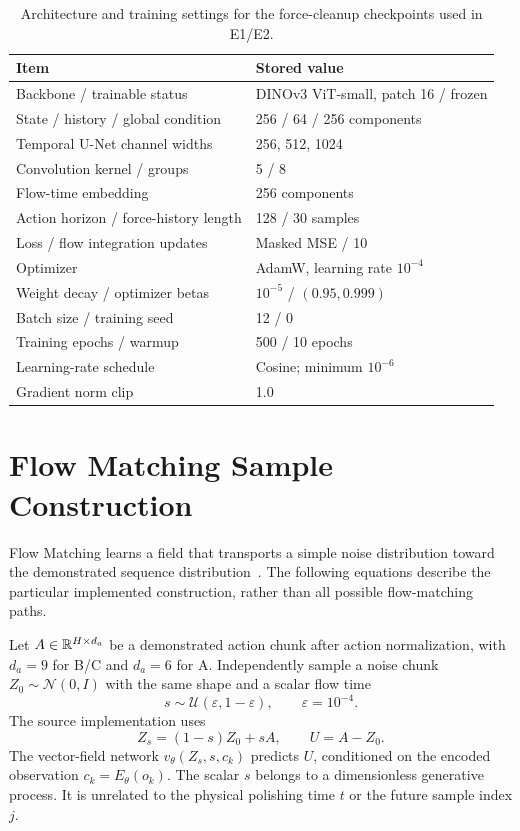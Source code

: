 \begin{table}[tbp]\centering\small
\caption[Architecture and training settings]{Architecture and training settings for the force-cleanup checkpoints used in E1/E2.}
\label{tab:learning_settings}
\begin{tabularx}{\textwidth}{P{0.48\textwidth}X}
\toprule Item & Stored value \\ \midrule
Backbone / trainable status & DINOv3 ViT-small, patch 16 / frozen \\
State / history / global condition & 256 / 64 / 256 components \\
Temporal U-Net channel widths & 256, 512, 1024 \\
Convolution kernel / groups & 5 / 8 \\
Flow-time embedding & 256 components \\
Action horizon / force-history length & 128 / 30 samples \\
Loss / flow integration updates & Masked MSE / 10 \\
Optimizer & AdamW, learning rate \(10^{-4}\) \\
Weight decay / optimizer betas & \(10^{-5}\) / \((0.95,0.999)\) \\
Batch size / training seed & 12 / 0 \\
Training epochs / warmup & 500 / 10 epochs \\
Learning-rate schedule & Cosine; minimum \(10^{-6}\) \\
Gradient norm clip & 1.0 \\
\bottomrule
\end{tabularx}
\end{table}

\section{Flow Matching Sample Construction}
Flow Matching learns a field that transports a simple noise distribution toward the demonstrated sequence distribution~\cite{lipman2023flow}. The following equations describe the particular implemented construction, rather than all possible flow-matching paths.

Let \(A\in\mathbb{R}^{H\times d_a}\) be a demonstrated action chunk after action normalization, with \(d_a=9\) for B/C and \(d_a=6\) for A. Independently sample a noise chunk \(Z_0\sim\mathcal N(0,I)\) with the same shape and a scalar flow time
\begin{equation}
 s\sim\mathcal U(\varepsilon,1-\varepsilon),\qquad\varepsilon=10^{-4}.
\end{equation}
The source implementation uses
\begin{equation}
 Z_s=(1-s)Z_0+sA,\qquad U=A-Z_0.
 \label{eq:flow_training_path}
\end{equation}
The vector-field network \(v_\theta(Z_s,s,c_k)\) predicts \(U\), conditioned on the encoded observation \(c_k=E_\theta(o_k)\). The scalar \(s\) belongs to a dimensionless generative process. It is unrelated to the physical polishing time \(t\) or the future sample index \(j\).

